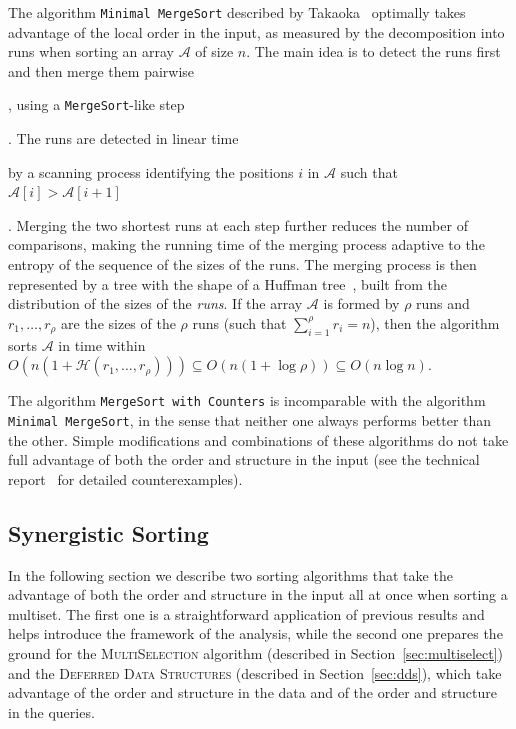 The algorithm \texttt{Minimal MergeSort} described by
Takaoka~\cite{2009-Chapter-PartialSolutionAndEntropy-Takaoka}
optimally takes advantage of the local order in the input, as measured
by the decomposition into runs when sorting an array $\mathcal{A}$ of
size $n$.  The main idea is to detect the runs first and then merge
them pairwise\begin{LONG}, using a \texttt{MergeSort}-like
  step\end{LONG}. The runs are detected in linear time\begin{LONG} by
  a scanning process identifying the positions $i$ in $\mathcal{A}$
  such that $\mathcal{A}[i] > \mathcal{A}[i+1]$\end{LONG}. Merging the
two shortest runs at each step further reduces the number of
comparisons, making the running time of the merging process adaptive
to the entropy of the sequence of the sizes of the runs.  The merging
process is then represented by a tree with the shape of a Huffman
tree~\cite{1952-IRE-AMethodForTheInstructionOfMinimumRedundancyCodes-Huffman},
built from the distribution of the sizes of the \emph{runs}.  If the
array $\mathcal{A}$ is formed by $\rho$ runs and
$r_1, \dots, r_{\rho}$ are the sizes of the $\rho$ runs (such that
$\sum_{i=1}^\rho {r_i}=n$), then the algorithm sorts $\mathcal{A}$ in
time within
$O(n(1+\mathcal{H}(r_1, \dots, r_{\rho}))) \subseteq
O(n(1{+}\log{\rho})) \subseteq O(n\log{n})$.

The algorithm \texttt{MergeSort with Counters} is incomparable with
the algorithm \texttt{Minimal MergeSort}, in the sense that neither
one always performs better than the other. Simple modifications and
combinations of these algorithms do not take full advantage of both
the order and structure in the input (see the technical
report~\cite{2016-ARXIV-SynergisticSortingAndDeferredDataStructuresOnMultiSets-BarbayOchoaSatty}
for detailed counterexamples).

\subsection{Synergistic Sorting}
\label{sec:syn-sort}

In the following section we describe two sorting algorithms that take
the advantage of both the order and structure in the input all at once
when sorting a multiset. The first one is a straightforward
application of previous results and helps introduce the framework of
the analysis, while the second one prepares the ground for the
\textsc{MultiSelection} algorithm (described in Section~\ref{sec:multiselect}) and
the \textsc{Deferred Data Structures} (described in Section~\ref{sec:dds}), which
take advantage of the order and structure in the data and of the order
and structure in the queries.

